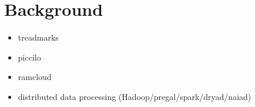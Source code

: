 \section{Background}
\label{sec:background}

\begin{itemize}
        \item treadmarks \\
        \item piccilo \\
        \item ramcloud \\
        \item distributed data processing (Hadoop/pregal/spark/dryad/naiad) \\
\end{itemize}
